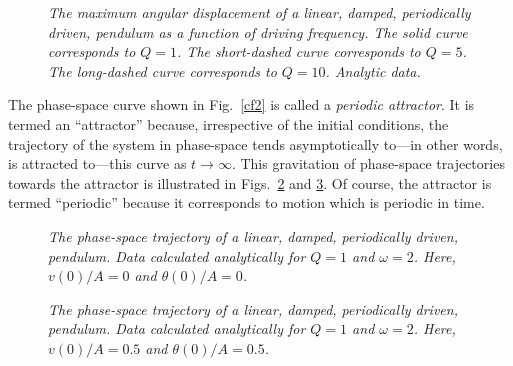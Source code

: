 \begin{figure}
\epsfysize=3in
\centerline{}
\caption{\em The maximum angular displacement of a linear, damped, periodically driven,
pendulum as a function of driving frequency. The solid curve corresponds to $Q=1$. The
short-dashed curve corresponds to $Q=5$. The long-dashed curve corresponds to $Q=10$.
Analytic data.}\label{cf3}
\end{figure}

The phase-space curve shown in Fig.~\ref{cf2} is called a {\em periodic attractor}. It is 
termed an ``attractor'' because,
irrespective of the initial conditions, the trajectory of the system in phase-space tends
asymptotically to---in other words, is attracted to---this curve as $t\rightarrow\infty$. This
gravitation of phase-space trajectories towards the attractor is illustrated in Figs.~\ref{cf4} and
\ref{cf5}. Of course, the attractor is termed ``periodic'' because it corresponds to motion which is
periodic in time.

\begin{figure}
\epsfysize=3in
\centerline{}
\caption{\em The phase-space trajectory of a linear, damped, periodically driven,
pendulum. Data calculated analytically for $Q=1$ and $\omega=2$. Here, $v(0)/A=0$ and $\theta(0)/A=0$.
}\label{cf4}
\end{figure}
\begin{figure}
\epsfysize=3in
\centerline{}
\caption{\em The phase-space trajectory of a linear, damped, periodically driven,
pendulum. Data calculated analytically for $Q=1$ and $\omega=2$.
Here, $v(0)/A=0.5$ and $\theta(0)/A=0.5$. }\label{cf5}
\end{figure}

